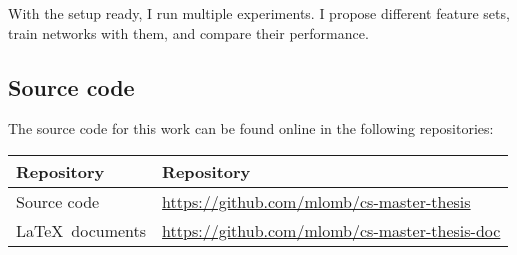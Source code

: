 With the setup ready, I run multiple experiments. I propose different feature sets, train networks with them, and compare their performance.

\subsection{Source code}

The source code for this work can be found online in the following repositories:

\begin{table}[H]
\centering
\begin{tabular}{ll}
\toprule
\textbf{Repository} & \textbf{Repository} \\
\midrule
Source code & \url{https://github.com/mlomb/cs-master-thesis} \\
\LaTeX\ documents & \url{https://github.com/mlomb/cs-master-thesis-doc}
\end{tabular}
\end{table}
